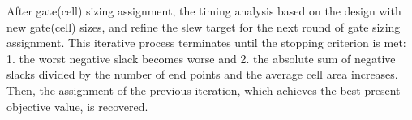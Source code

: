 After gate(cell) sizing assignment, the timing analysis based on the design with new gate(cell) sizes, and refine the slew target for the next round of gate sizing assignment. This iterative process terminates until the stopping criterion is met: 1. the worst negative slack becomes worse and 2. the absolute sum of negative slacks divided by the number of end points and the average cell area increases. Then, the assignment of the previous iteration, which achieves the best present objective value, is recovered.


%


